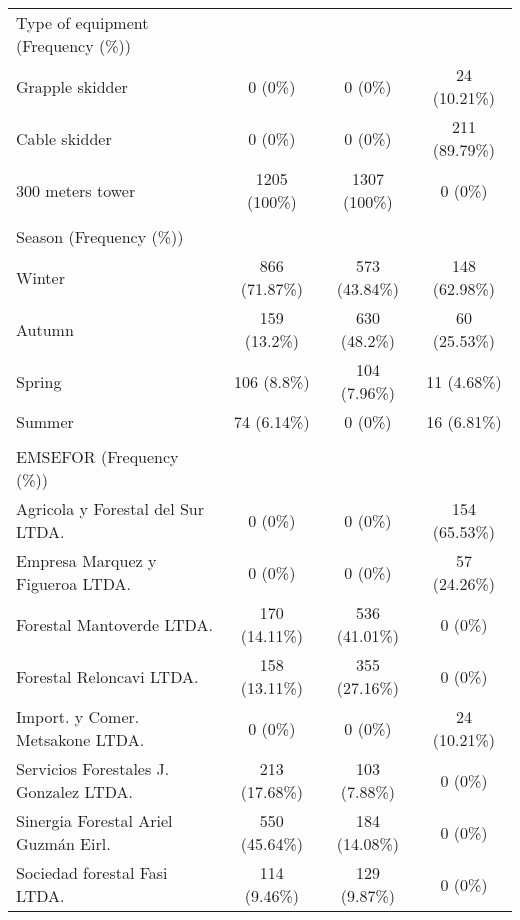 \documentclass[conference]{IEEEtran}
\begin{document}
\begin{table}[htpb]
\begin{tabular}{l || c c c}
Type of equipment (Frequency (\%)) &  &  &  \\ 
Grapple skidder & 0 (0\%) & 0 (0\%) & 24 (10.21\%) \\ 
Cable skidder & 0 (0\%) & 0 (0\%) & 211 (89.79\%) \\ 
300 meters tower & 1205 (100\%) & 1307 (100\%) & 0 (0\%) \\ 
\\
Season (Frequency (\%)) &  &  &  \\ 
Winter & 866 (71.87\%) & 573 (43.84\%) & 148 (62.98\%) \\ 
Autumn & 159 (13.2\%) & 630 (48.2\%) & 60 (25.53\%) \\ 
Spring & 106 (8.8\%) & 104 (7.96\%) & 11 (4.68\%) \\ 
Summer & 74 (6.14\%) & 0 (0\%) & 16 (6.81\%) \\ 
\\
EMSEFOR (Frequency (\%)) &  &  &  \\ 
Agricola y Forestal del Sur LTDA. & 0 (0\%) & 0 (0\%) & 154 (65.53\%) \\ 
Empresa Marquez y Figueroa LTDA. & 0 (0\%) & 0 (0\%) & 57 (24.26\%) \\ 
Forestal Mantoverde LTDA. & 170 (14.11\%) & 536 (41.01\%) & 0 (0\%) \\ 
Forestal Reloncavi LTDA. & 158 (13.11\%) & 355 (27.16\%) & 0 (0\%) \\ 
Import. y Comer. Metsakone LTDA. & 0 (0\%) & 0 (0\%) & 24 (10.21\%) \\ 
Servicios Forestales J. Gonzalez LTDA. & 213 (17.68\%) & 103 (7.88\%) & 0 (0\%) \\ 
Sinergia Forestal Ariel Guzmán Eirl. & 550 (45.64\%) & 184 (14.08\%) & 0 (0\%) \\ 
Sociedad forestal Fasi LTDA. & 114 (9.46\%) & 129 (9.87\%) & 0 (0\%) \\ 

\end{tabular}
\end{table}
\end{document}
